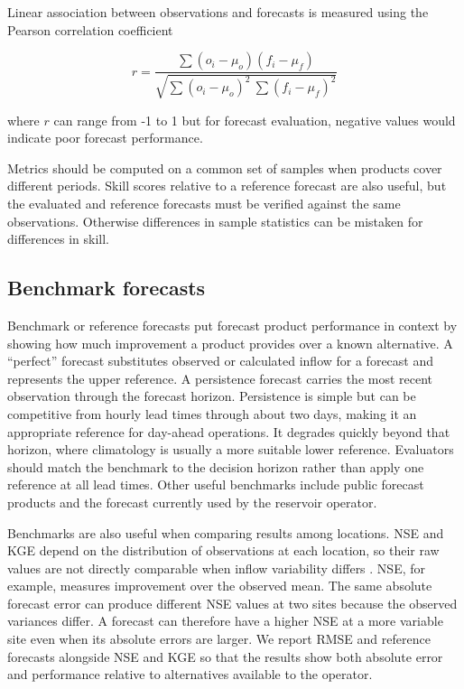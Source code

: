 \documentclass[MLA]{USG} %
\begin{document}
Linear association between observations and forecasts is measured using the Pearson correlation coefficient

\begin{equation}
    r = \frac{\sum(o_i-\mu_o)(f_i-\mu_f)}{\sqrt{\sum(o_i-\mu_o)^2\ \sum(f_i-\mu_f)^2}}
\end{equation}

where $r$ can range from -1 to 1 but for forecast evaluation, negative values would indicate poor forecast performance.

Metrics should be computed on a common set of samples when products cover different periods. Skill scores relative to a reference forecast are also useful, but the evaluated and reference forecasts must be verified against the same observations. Otherwise differences in sample statistics can be mistaken for differences in skill.

\subsection{Benchmark forecasts}\label{sec:benchmarks}
Benchmark or reference forecasts put forecast product performance in context by showing how much improvement a product provides over a known alternative. A ``perfect'' forecast substitutes observed or calculated inflow for a forecast and represents the upper reference. A persistence forecast carries the most recent observation through the forecast horizon. Persistence is simple but can be competitive from hourly lead times through about two days, making it an appropriate reference for day-ahead operations. It degrades quickly beyond that horizon, where climatology is usually a more suitable lower reference. Evaluators should match the benchmark to the decision horizon rather than apply one reference at all lead times. Other useful benchmarks include public forecast products and the forecast currently used by the reservoir operator.

Benchmarks are also useful when comparing results among locations. NSE and KGE depend on the distribution of observations at each location, so their raw values are not directly comparable when inflow variability differs \citep{knobenTechnicalNoteInherent2019a}. NSE, for example, measures improvement over the observed mean. The same absolute forecast error can produce different NSE values at two sites because the observed variances differ. A forecast can therefore have a higher NSE at a more variable site even when its absolute errors are larger. We report RMSE and reference forecasts alongside NSE and KGE so that the results show both absolute error and performance relative to alternatives available to the operator.
\end{document}

